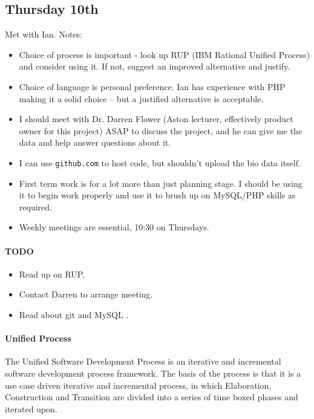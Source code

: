 \subsection{Thursday 10th}
Met with Ian. Notes:

\begin{itemize}
\item Choice of process is important - look up RUP (IBM Rational Unified
  Process) \cite{IBMRUP} and consider using it. If not, suggest an improved
  alternative and justify.
\item Choice of language is personal preference. Ian has experience with PHP
  making it a solid choice – but a justified alternative is acceptable.
\item I should meet with Dr. Darren Flower (Aston lecturer, effectively product
  owner for this project) ASAP to discuss the project, and he can give me the
  data and help answer questions about it.
\item I can use \texttt{github.com} to host code, but shouldn't upload the bio
  data itself.
\item First term work is for a lot more than just planning stage. I should be
  using it to begin work properly and use it to brush up on MySQL/PHP skills as
  required.
\item Weekly meetings are essential, 10:30 on Thursdays.
\end{itemize}

\paragraph{TODO}
\begin{itemize}
\item Read up on RUP.
\item Contact Darren to arrange meeting.
\item Read about git and MySQL \cite{Kulbertis2011}.
\end{itemize}

\paragraph{Unified Process} The Unified Software Development Process is an
iterative and incremental software development process framework. The basis of
the process is that it is a use case driven iterative and incremental process,
in which Elaboration, Construction and Transition are divided into a series of
time boxed phases and iterated upon.

